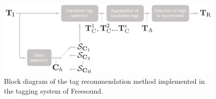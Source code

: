\begin{figure}
\centerline{\includegraphics[width=\figSizeMidLarge]{ch05_impact/pics/fig01_diagram}}
\caption[Block diagram of the tag recommendation method implemented in Freesound]{Block diagram of the tag recommendation method implemented in the tagging system of Freesound.} 
\label{impact:fig:diagram}
\end{figure}


